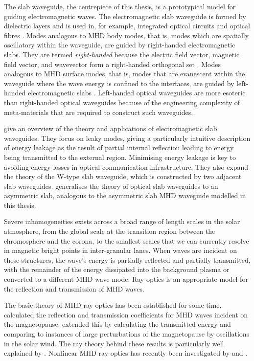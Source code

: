 	The slab waveguide, the centrepiece of this thesis, is a prototypical model for guiding electromagnetic waves. The electromagnetic slab waveguide is formed by dielectric layers and is used in, for example, integrated optical circuits and optical fibres \citep{ram_etal84}. Modes analogous to MHD body modes, that is, modes which are spatially oscillatory within the waveguide, are guided by right-handed electromagnetic slabs. They are termed \textit{right-handed} because the electric field vector, magnetic field vector, and wavevector form a right-handed orthogonal set \citep{ram_etal84}. Modes analogous to MHD surface modes, that is, modes that are evanescent within the waveguide where the wave energy is confined to the interfaces, are guided by left-handed electromagnetic slabs  \cite{wan_etal08,ash13,sha_etal03}. Left-handed optical waveguides are more esoteric than right-handed optical waveguides because of the engineering complexity of meta-materials that are required to construct such waveguides.
	
	\cite{Hu_etal09} give an overview of the theory and applications of electromagnetic slab waveguides. They focus on leaky modes, giving a particularly intuitive description of energy leakage as the result of partial internal reflection leading to energy being transmitted to the external region. Minimising energy leakage is key to avoiding energy losses in optical communication infrastructure. They also expand the theory of the W-type slab waveguide, which is constructed by two adjacent slab waveguides. \cite{mar74} generalises the theory of optical slab waveguides to an asymmetric slab, analogous to the asymmetric slab MHD waveguide modelled in this thesis.
	
	Severe inhomogeneities exists across a broad range of length scales in the solar atmosphere, from the global scale at the transition region between the chromosphere and the corona, to the smallest scales that we can currently resolve in magnetic bright points in inter-granular lanes. When waves are incident on these structures, the wave's energy is partially reflected and partially transmitted, with the remainder of the energy dissipated into the background plasma or converted to a different MHD wave mode. Ray optics is an appropriate model for the reflection and transmission of MHD waves.
	
	The basic theory of MHD ray optics has been established for some time. \cite{mck70} calculated the reflection and transmission coefficients for MHD waves incident on the magnetopause. \cite{ver73} extended this by calculating the transmitted energy and \cite{wol_etal75} comparing to instances of large perturbations of the magnetopause by oscillations in the solar wind. The ray theory behind these results is particularly well explained by \cite{wal04}. Nonlinear MHD ray optics has recently been investigated by \cite{nun18} and \cite{nun20}.
	
